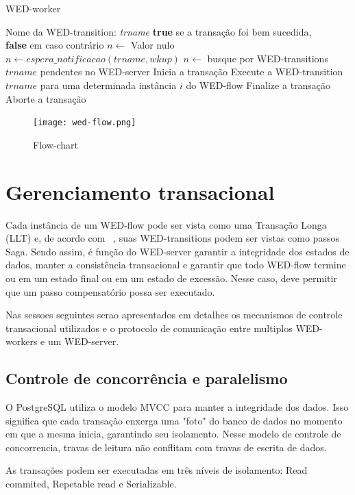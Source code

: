 \documentclass[conference]{IEEEtran}
\begin{document}
\begin{algorithm}
\caption{WED-worker}
\label{alg1}
\begin{algorithmic}[1]
\REQUIRE Nome da WED-transition: \emph{trname}
\ENSURE \textbf{true} se a transação foi bem sucedida,\\
         \hspace{23pt}\textbf{false} em caso contrário
\LOOP
\STATE $n \leftarrow$ Valor nulo
\STATE $n \leftarrow espera\_notificacao(trname,wkup)$
\STATE $n \leftarrow $ busque por WED-transitions $trname$ pendentes no WED-server
\ENDIF
\ENDWHILE
\STATE Inicia a transação 
\STATE Execute a WED-transition $trname$ para uma determinada instância $i$ do WED-flow
\STATE Finalize a transação
\RETURN \TRUE
\ELSE
\STATE Aborte a transação
\RETURN \FALSE
\ENDIF  
\ENDLOOP

\end{algorithmic}
\end{algorithm}

\begin{figure}[!t]
\centering
\texttt{[image: wed-flow.png]}
\caption{Flow-chart}
\label{fig_wf}
\end{figure}

\section{Gerenciamento transacional}
Cada instância de um WED-flow pode ser vista como uma Transação Longa (LLT) e, de acordo com ~\cite{SGD87},
suas WED-transitions podem ser vistas como passos Saga. Sendo assim, é função do WED-server garantir a integridade dos estados
de dados, manter a consistência transacional e garantir que todo WED-flow termine ou em um estado final ou em um estado
de excessão. Nesse caso, deve permitir que um passo compensatório possa ser executado. 
\par
Nas sessoes seguintes serao apresentados em detalhes os mecanismos de controle transacional utilizados e o protocolo de
comunicação entre multiplos WED-workers e um WED-server.
\subsection{Controle de concorrência e paralelismo}
O PostgreSQL utiliza o modelo MVCC para manter a integridade dos dados. Isso significa que cada transação enxerga uma "foto"
do banco de dados no momento em que a mesma inicia, garantindo seu isolamento. Nesse modelo de controle de concorrencia,
travas de leitura não conflitam com travas de escrita de dados.
\par As transações podem ser executadas em três níveis de isolamento: Read commited, Repetable read e Serializable.
\end{document}

